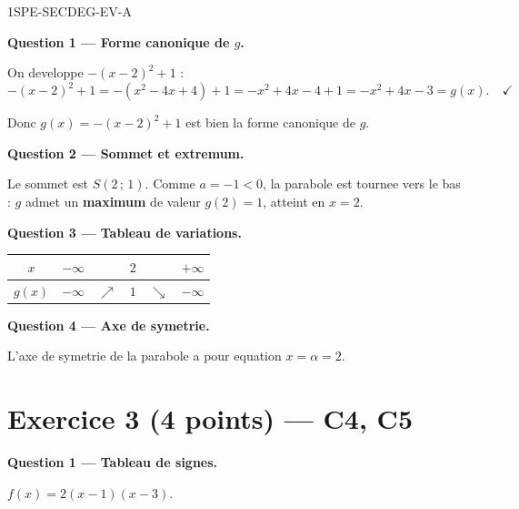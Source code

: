 \begin{corrige}{1SPE-SECDEG-EV-A}

\bigskip
\textbf{Question 1 — Forme canonique de $g$.}


On developpe $-(x-2)^2 + 1$ :
\[
-(x-2)^2 + 1 = -(x^2 - 4x + 4) + 1 = -x^2 + 4x - 4 + 1 = -x^2 + 4x - 3 = g(x). \quad \checkmark
\]

Donc $g(x) = -(x-2)^2 + 1$ est bien la forme canonique de $g$.

\medskip
\textbf{Question 2 — Sommet et extremum.}


Le sommet est $S(2\,;\,1)$. Comme $a = -1 < 0$, la parabole est tournee vers le bas : $g$ admet un \textbf{maximum} de valeur $g(2) = 1$, atteint en $x = 2$.

\medskip
\textbf{Question 3 — Tableau de variations.}

\begin{center}
\begin{tabular}{|c|ccccc|}
\hline
$x$ & $-\infty$ & & $2$ & & $+\infty$ \\
\hline
$g(x)$ & $-\infty$ & $\nearrow$ & $1$ & $\searrow$ & $-\infty$ \\
\hline
\end{tabular}
\end{center}

\medskip
\textbf{Question 4 — Axe de symetrie.}

L'axe de symetrie de la parabole a pour equation $x = \alpha = 2$.

\section*{Exercice 3 \hfill (4 points) — C4, C5}


\bigskip
\textbf{Question 1 — Tableau de signes.}


$f(x) = 2(x-1)(x-3)$.


\end{corrige}
